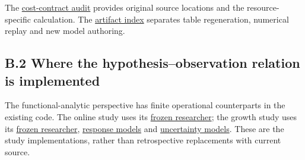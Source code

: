 \documentclass[11pt,a4paper]{article}
\begin{document}
The \hyperlink{artifact-43}{cost-contract audit} provides original source locations and the resource-specific calculation. The \hyperlink{artifact-44}{artifact index} separates table regeneration, numerical replay and new model authoring.


\subsection*{B.2 Where the hypothesis–observation relation is implemented}

The functional-analytic perspective has finite operational counterparts in the existing code. The online study uses its \hyperlink{artifact-45}{frozen researcher}; the growth study uses its \hyperlink{artifact-46}{frozen researcher}, \hyperlink{artifact-47}{response models} and \hyperlink{artifact-48}{uncertainty models}. These are the study implementations, rather than retrospective replacements with current source.
\end{document}

